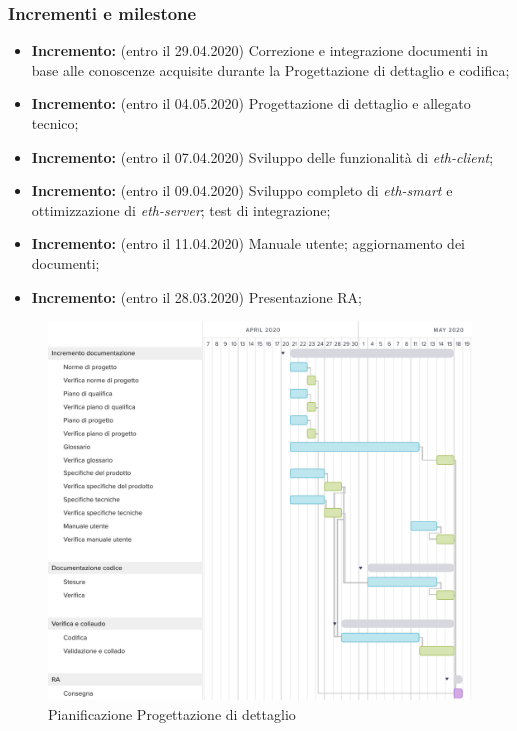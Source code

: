 \subsubsection{Incrementi e milestone}
\begin{itemize}
	\item \textbf{ Incremento:} (entro il 29.04.2020) Correzione e integrazione documenti in base alle conoscenze acquisite durante la Progettazione di dettaglio e codifica;
	\item \textbf{ Incremento:} (entro il 04.05.2020) Progettazione di dettaglio e allegato tecnico;
	\item \textbf{ Incremento:} (entro il 07.04.2020) Sviluppo delle funzionalità di \textit{eth-client};
	\item \textbf{ Incremento:} (entro il 09.04.2020) Sviluppo completo di \textit{eth-smart} e ottimizzazione di \textit{eth-server}; test di integrazione;
	\item \textbf{ Incremento:} (entro il 11.04.2020) Manuale utente; aggiornamento dei documenti;
	\item \textbf{ Incremento:} (entro il 28.03.2020) Presentazione RA;
\end{itemize}

\begin{figure}[h!]
	\includegraphics[width=\textwidth]{res/img/g5}
	\caption{Pianificazione Progettazione di dettaglio}
\end{figure}
